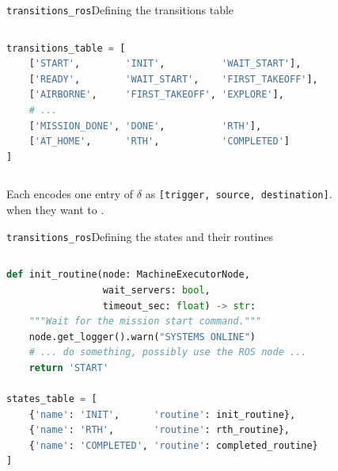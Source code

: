 \begin{frame}[fragile]{\texttt{transitions\_ros}}{Defining the transitions table}
  \begin{columns}
    \begin{lstlisting}[language=Python, caption=Example of transitions table in \texttt{transitions\_ros}.]
transitions_table = [
    ['START',        'INIT',          'WAIT_START'],
    ['READY',        'WAIT_START',    'FIRST_TAKEOFF'],
    ['AIRBORNE',     'FIRST_TAKEOFF', 'EXPLORE'],
    # ...
    ['MISSION_DONE', 'DONE',          'RTH'],
    ['AT_HOME',      'RTH',           'COMPLETED']
]
\end{lstlisting}
  \end{columns}
  \bigskip
  Each  encodes one entry of $\delta$ as \texttt{[trigger, source, destination]}.\\
   when they want to .
\end{frame}
\begin{frame}[fragile]{\texttt{transitions\_ros}}{Defining the states and their routines}
  \begin{columns}
    \begin{lstlisting}[language=Python, caption=A state routine and a states table.]
def init_routine(node: MachineExecutorNode,
                 wait_servers: bool,
                 timeout_sec: float) -> str:
    """Wait for the mission start command."""
    node.get_logger().warn("SYSTEMS ONLINE")
    # ... do something, possibly use the ROS node ...
    return 'START'

states_table = [
    {'name': 'INIT',      'routine': init_routine},
    {'name': 'RTH',       'routine': rth_routine},
    {'name': 'COMPLETED', 'routine': completed_routine}
]
\end{lstlisting}
  \end{columns}
\end{frame}
